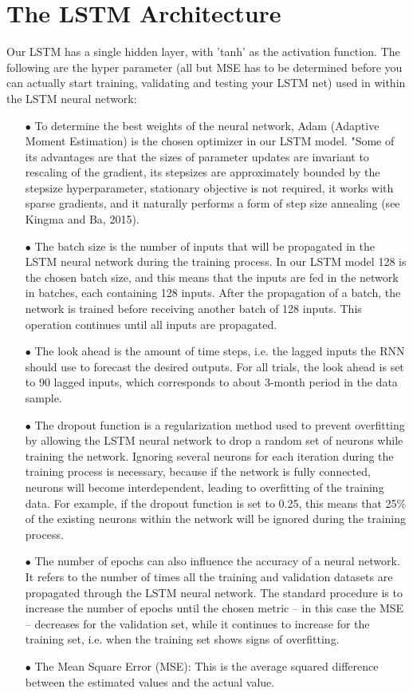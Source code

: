 \documentclass[a4paper,11pt,oneside]{book}
\begin{document}
\section{The LSTM Architecture}
Our LSTM has a single hidden layer,  with 'tanh' as the activation function. The following are the hyper parameter (all but MSE has to be determined before you can actually start training, validating and testing your LSTM net) used in within the LSTM neural network:
\begin{itemize}

\item[$\bullet$]   
To determine the best weights of the neural network, Adam (Adaptive Moment Estimation) is the chosen optimizer in our LSTM model. "Some of its advantages are that the sizes of parameter updates are invariant to
rescaling of the gradient, its stepsizes are approximately bounded by the stepsize hyperparameter, stationary objective is not required, it works with sparse gradients, and it naturally performs a
form of step size annealing (see Kingma and Ba, 2015).
\item[$\bullet$] The batch size is the number of inputs that will be propagated in the
LSTM neural network during the training process. In our LSTM model 128 is the chosen batch size, and this means that the inputs are
fed in the network in batches, each containing 128 inputs. After
the propagation of a batch, the network is trained before receiving another
batch of 128 inputs. This operation continues until all inputs are propagated.
\item[$\bullet$] The look ahead is the amount of time steps, i.e. the lagged
inputs the RNN should use to forecast the desired outputs. For all trials, the look ahead is set to 90 lagged inputs, which
corresponds to about 3-month period in the data sample.
\item[$\bullet$] The dropout function is a regularization method used to prevent overfitting by
allowing the LSTM neural network to drop a random set of neurons while
training the network. Ignoring several neurons for each iteration during the
training process is necessary, because if the network is fully connected,
neurons will become interdependent, leading to overfitting of the training data. For example, if the dropout function is set to 0.25, this means that 25\% of the existing
neurons within the network will be ignored during the training process.
\item[$\bullet$] The number of epochs can also influence the accuracy of a neural network. It
refers to the number of times all the training and validation datasets are
propagated through the LSTM neural network. The standard procedure is to
increase the number of epochs until the chosen metric – in this case the MSE
– decreases for the validation set, while it continues to increase for the training
set, i.e. when the training set shows signs of overfitting.
\item[$\bullet$] The Mean Square Error (MSE): This is the average squared difference between the estimated values and the actual value.
\end{itemize}
\end{document}
